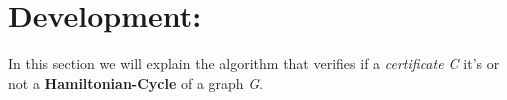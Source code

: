 \section{Development:}

In this section we will explain the algorithm that verifies if a {\itshape certificate C} it's or not a {\bfseries Hamiltonian-Cycle} of a graph {\itshape G}.
